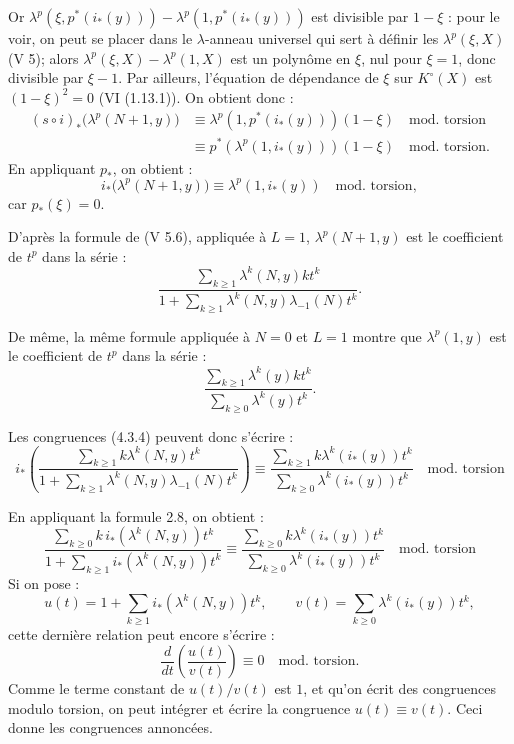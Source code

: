 \documentclass{article}
\begin{document}
Or \(\lambda^p(\xi,p^*(i_*(y)))-\lambda^p(1,p^*(i_*(y)))\) est divisible par \(1-\xi\) :
pour le voir, on peut se placer dans le \(\lambda\)-anneau universel qui sert à définir les \(\lambda^p(\xi,X)\) (V 5); alors \(\lambda^p(\xi,X)-\lambda^p(1,X)\) est un polynôme en \(\xi\), nul pour \(\xi=1\), donc divisible par \(\xi-1\). Par ailleurs, l'équation de dépendance de \(\xi\) sur \(K^\circ(X)\) est \((1-\xi)^2=0\) (VI (1.13.1)). On obtient donc :
\[
\begin{aligned}
(s\circ i)_*\bigl(\lambda^p(N+1,y)\bigr)
&\equiv \lambda^p(1,p^*(i_*(y)))(1-\xi) \quad\text{mod.\ torsion}\\
&\equiv p^*(\lambda^p(1,i_*(y)))(1-\xi) \quad\text{mod.\ torsion}.
\end{aligned}
\]
En appliquant \(p_*\), on obtient :
\begin{equation}\tag{4.3.4}
  i_*\bigl(\lambda^p(N+1,y)\bigr)
  \equiv \lambda^p(1,i_*(y)) \quad\text{mod.\ torsion},
\end{equation}
car \(p_*(\xi)=0\).

D'après la formule de (V 5.6), appliquée à \(L=1\), \(\lambda^p(N+1,y)\) est le coefficient de \(t^p\) dans la série :
\[
  \frac{\sum_{k\ge1}\lambda^k(N,y)kt^k}
       {1+\sum_{k\ge1}\lambda^k(N,y)\lambda_{-1}(N)t^k}.
\]

De même, la même formule appliquée à \(N=0\) et \(L=1\) montre que \(\lambda^p(1,y)\) est le coefficient de \(t^p\) dans la série :
\[
  \frac{\sum_{k\ge1}\lambda^k(y)kt^k}
       {\sum_{k\ge0}\lambda^k(y)t^k}.
\]

Les congruences (4.3.4) peuvent donc s'écrire :
\[
i_*\left(
  \frac{\sum_{k\ge1}k\lambda^k(N,y)t^k}
       {1+\sum_{k\ge1}\lambda^k(N,y)\lambda_{-1}(N)t^k}
\right)
\equiv
  \frac{\sum_{k\ge1}k\lambda^k(i_*(y))t^k}
       {\sum_{k\ge0}\lambda^k(i_*(y))t^k}
       \quad\text{mod.\ torsion}
\]

En
appliquant la formule 2.8, on obtient :
\[
  \frac{\sum_{k\ge0}k\,i_*(\lambda^k(N,y))t^k}
       {1+\sum_{k\ge1} i_*(\lambda^k(N,y))t^k}
  \equiv
  \frac{\sum_{k\ge0}k\lambda^k(i_*(y))t^k}
       {\sum_{k\ge0}\lambda^k(i_*(y))t^k}
       \quad\text{mod.\ torsion}
\]
Si on pose :
\[
  u(t)=1+\sum_{k\ge1}i_*(\lambda^k(N,y))t^k,\qquad
  v(t)=\sum_{k\ge0}\lambda^k(i_*(y))t^k,
\]
cette dernière relation peut encore s'écrire :
\[
  \frac{d}{dt}\!\left(\frac{u(t)}{v(t)}\right)\equiv0
  \quad\text{mod.\ torsion}.
\]
Comme le terme constant de \(u(t)/v(t)\) est \(1\), et qu'on écrit des congruences modulo torsion, on peut intégrer et écrire la congruence \(u(t)\equiv v(t)\). Ceci donne les congruences annoncées.
\end{document}
